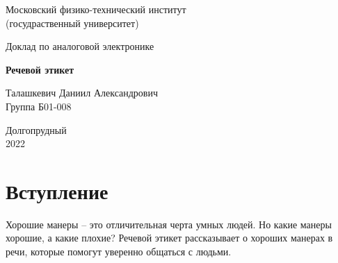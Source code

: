 \documentclass[a4paper, 12pt]{article}%
\begin{document}


\begin{titlepage}

	\newpage
	\begin{center}
		\normalsize Московский физико-технический институт \\(госудраственный 			университет)
	\end{center}

	\vspace{6em}

	\begin{center}
		\Large Доклад по аналоговой электронике\\
	\end{center}

	\vspace{1em}

	\begin{center}
		\large \textbf{Речевой этикет}
	\end{center}

	\vspace{2em}

	\begin{center}
		\large Талашкевич Даниил Александрович\\
		Группа Б01-008
	\end{center}

	\vspace{\fill}

	\begin{center}
	Долгопрудный \\2022
	\end{center}
	
\end{titlepage}



	\thispagestyle{empty}
	\newpage
	\tableofcontents
	\newpage
	\setcounter{page}{1}



\section{Вступление}

Хорошие манеры – это отличительная черта умных людей. Но какие манеры хорошие, а какие плохие? Речевой этикет рассказывает о хороших манерах в речи, которые помогут уверенно общаться с людьми.
\end{document}
